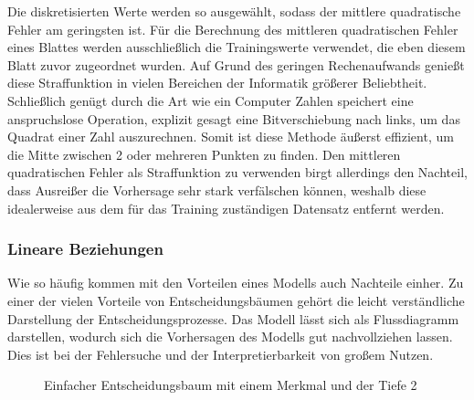 \documentclass[12pt, a4paper]{article}
\begin{document}
Die diskretisierten Werte werden so ausgewählt, sodass der mittlere quadratische Fehler am geringsten ist. Für die Berechnung des mittleren quadratischen Fehler eines Blattes werden ausschließlich die Trainingswerte verwendet, die eben diesem Blatt zuvor zugeordnet wurden. Auf Grund des geringen Rechenaufwands genießt diese Straffunktion in vielen Bereichen der Informatik größerer Beliebtheit. Schließlich genügt durch die Art wie ein Computer Zahlen speichert eine anspruchslose Operation, explizit gesagt eine Bitverschiebung nach links, um das Quadrat einer Zahl auszurechnen. Somit ist diese Methode äußerst effizient, um die Mitte zwischen 2 oder mehreren Punkten zu finden. Den mittleren quadratischen Fehler als Straffunktion zu verwenden birgt allerdings den Nachteil, dass Ausreißer die Vorhersage sehr stark verfälschen können, weshalb diese idealerweise aus dem für das Training zuständigen Datensatz entfernt werden.



\subsubsection{Lineare Beziehungen}

Wie so häufig kommen mit den Vorteilen eines Modells auch Nachteile einher. Zu einer der vielen Vorteile von Entscheidungsbäumen gehört die leicht verständliche Darstellung der Entscheidungsprozesse. Das Modell lässt sich als Flussdiagramm darstellen, wodurch sich die Vorhersagen des Modells gut nachvollziehen lassen. Dies ist bei der Fehlersuche und der Interpretierbarkeit von großem Nutzen.

\begin{figure}
\centering
\def\svgwidth{350pt}

\caption{Einfacher Entscheidungsbaum mit einem Merkmal und der Tiefe 2}
\label{fig:decisiontree_linear}
\end {figure}
\end{document}
